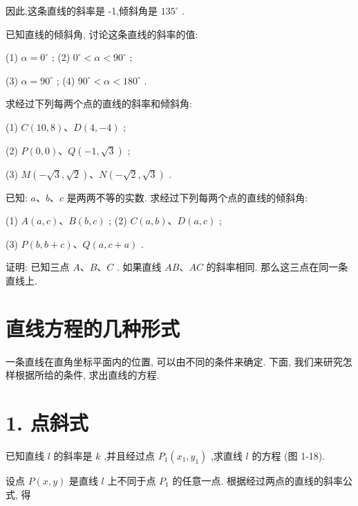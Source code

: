 \documentclass[lang=cn,newtx,10pt,scheme=chinese]{elegantbook}
\begin{document}
因此,这条直线的斜率是 -1,倾斜角是 \({135}^{ \circ }\) .

\begin{problemset}[练习]

\item 已知直线的倾斜角, 讨论这条直线的斜率的值:

(1) \(\alpha = {0}^{ \circ }\) ; (2) \({0}^{ \circ } < \alpha < {90}^{ \circ }\) ;

(3) \(\alpha = {90}^{ \circ }\) ; (4) \({90}^{ \circ } < \alpha < {180}^{ \circ }\) .

\item 求经过下列每两个点的直线的斜率和倾斜角:

(1) \(C\left( {{10},8}\right) \text{、}D\left( {4, - 4}\right)\) ;

(2) \(P\left( {0,0}\right) \text{、}Q\left( {-1,\sqrt{3}}\right)\) ;

(3) \(M\left( {-\sqrt{3},\sqrt{2}}\right) \text{、}N\left( {-\sqrt{2},\sqrt{3}}\right)\) .

\item 已知: \(a\text{、}b\text{、}c\) 是两两不等的实数. 求经过下列每两个点的直线的倾斜角:

(1) \(A\left( {a,c}\right) \text{、}B\left( {b,c}\right)\) ; (2) \(C\left( {a,b}\right) \text{、}D\left( {a,c}\right)\) ;

(3) \(P\left( {b,b + c}\right) \text{、}Q\left( {a,c + a}\right)\) .

\item 证明: 已知三点 \(A\text{、}B\text{、}C\) . 如果直线 \({AB}\text{、}{AC}\) 的斜率相同. 那么这三点在同一条直线上.
\end{problemset}

\section{直线方程的几种形式}

一条直线在直角坐标平面内的位置, 可以由不同的条件来确定. 下面, 我们来研究怎样根据所给的条件, 求出直线的方程.

\section*{1. 点斜式}

已知直线 \(l\) 的斜率是 \(k\) ,并且经过点 \({P}_{1}\left( {{x}_{1},{y}_{1}}\right)\) ,求直线 \(l\) 的方程 (图 1-18).

设点 \(P\left( {x,y}\right)\) 是直线 \(l\) 上不同于点 \({P}_{1}\) 的任意一点. 根据经过两点的直线的斜率公式, 得
\end{document}
